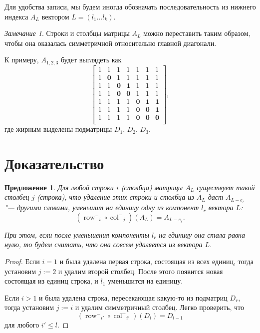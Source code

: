\documentclass[oneside, a4paper]{article}
\newtheorem{proposition}{Предложение}
\theoremstyle{definition}
\theoremstyle{remark}
\newtheorem{remark}{Замечание}
\newcommand\rowm{\ensuremath{\operatorname{row}^-}}
\newcommand\colm{\ensuremath{\operatorname{col}^-}}
\begin{document}
Для удобства записи, мы будем иногда обозначать последовательность из нижнего
индекса $A_L$ вектором $L = (l_1 \dots l_k)$.

\begin{remark}
Строки и столбцы матрицы $A_L$ можно переставить таким образом, чтобы она
оказалась симметричной относительно главной диагонали.
\end{remark}

К примеру, $A_{1, 2, 3}$ будет выглядеть как
\[
\begin{bmatrix}
1 & 1 & 1 & 1 & 1 & 1 & 1 \\
1 & \mathbf{0} & 1 & 1 & 1 & 1 & 1 \\
1 & 1 & \mathbf{0} & \mathbf{1} & 1 & 1 & 1 \\
1 & 1 & \mathbf{0} & \mathbf{0} & 1 & 1 & 1 \\
1 & 1 & 1 & 1 & \mathbf{0} & \mathbf{1} & \mathbf{1} \\
1 & 1 & 1 & 1 & \mathbf{0} & \mathbf{0} & \mathbf{1} \\
1 & 1 & 1 & 1 & \mathbf{0} & \mathbf{0} & \mathbf{0} \\
\end{bmatrix},
\]
где жирным выделены подматрицы $D_1$, $D_2$, $D_3$.

\section{Доказательство}

\begin{proposition} \label{easy}
Для любой строки $i$ (столбца) матрицы $A_L$ существует такой столбец $j$
(строка), что удаление этих строки и столбца из $A_L$ даст $A_{L - e_r}$ "---
другими словами, уменьшит на единицу одну из компонент $l_r$ вектора $L$:
\[
(\rowm_i \circ \colm_j)(A_L) = A_{L - e_r}.
\]

При этом, если после уменьшения компоненты $l_r$ на единицу она стала равна нулю,
то будем считать, что она совсем удаляется из вектора $L$.
\end{proposition}
\begin{proof}
Если $i = 1$ и была удалена первая строка, состоящая из всех единиц, тогда
установим $j := 2$ и удалим второй столбец. После этого появится новая состоящая
из единиц строка, и $l_1$ уменьшится на единицу.

Если $i > 1$ и была удалена строка, пересекающая какую-то из подматриц $D_r$,
тогда установим $j := i$ и удалим симметричный столбец. Легко проверить, что
\[
(\rowm_{i'} \circ \colm_{i'})(D_l) = D_{l-1}
\]
для любого $i' \leq l$.
\end{proof}
\end{document}
